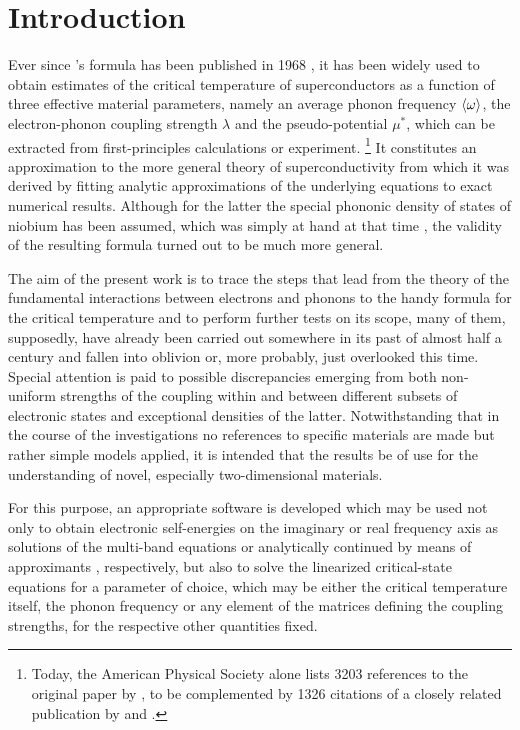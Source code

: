 
\chapter{Introduction}

Ever since 's formula has been published in 1968
\cite{McMillan68}, it has been widely used to obtain estimates of the critical
temperature of superconductors as a function of three effective material
parameters, namely an average phonon frequency $\langle\omega\rangle$, the electron-phonon
coupling strength $\lambda$ and the  pseudo-potential $\mu^*$,
which can be extracted from first-principles calculations or experiment.%
%
\footnote{Today, the American Physical Society alone lists 3203 references to
the original paper by , to be complemented by 1326 citations of a
closely related publication by  and 
\cite{AllenDynes75}.}
%
It constitutes an approximation to the more general  theory of
superconductivity \cite{Eliashberg60} from which it was derived by fitting
analytic approximations of the underlying equations to exact numerical results.
Although for the latter the special phononic density of states of niobium has
been assumed, which was simply at hand at that time \cite{NakagawaWoods63}, the
validity of the resulting formula turned out to be much more general.

The aim of the present work is to trace the steps that lead from the theory of
the fundamental interactions between electrons and phonons to the handy formula
for the critical temperature and to perform further tests on its scope, many of
them, supposedly, have already been carried out somewhere in its past of almost
half a century and fallen into oblivion or, more probably, just overlooked this
time. Special attention is paid to possible discrepancies emerging from both
non-uniform strengths of the coupling within and between different subsets of
electronic states and exceptional densities of the latter. Notwithstanding that
in the course of the investigations no references to specific materials are made
but rather simple models applied, it is intended that the results be of use for
the understanding of novel, especially two-dimensional materials.

For this purpose, an appropriate software is developed which may be used not
only to obtain electronic self-energies on the imaginary or real frequency axis
as solutions of the multi-band  equations or analytically
continued by means of  approximants \cite{VidbergSerene77},
respectively, but also to solve the linearized critical-state equations for a
parameter of choice, which may be either the critical temperature itself, the
phonon frequency or any element of the matrices defining the coupling strengths,
for the respective other quantities fixed.


